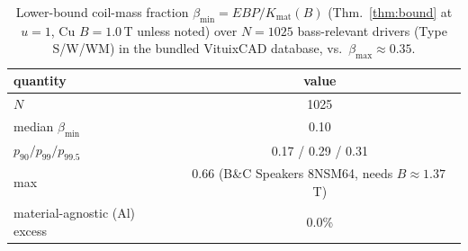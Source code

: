 \begin{table}[htbp]
\centering
\caption{Lower-bound coil-mass fraction $\beta_{\min}=EBP/K_{\mathrm{mat}}(B)$ (Thm.~\ref{thm:bound} at $u{=}1$, Cu $B{=}1.0$\,T unless noted) over $N{=}1025$ bass-relevant drivers (Type S/W/WM) in the bundled VituixCAD database, vs.\ $\beta_{\max}\approx0.35$.}
\label{tab:ebp-census}
\small
\begin{tabular}{lc}
\toprule
quantity & value\\
\midrule
$N$ & 1025\\
median $\beta_{\min}$ & 0.10\\
$p_{90}/p_{99}/p_{99.5}$ & 0.17 / 0.29 / 0.31\\
max & 0.66 (B\&C Speakers 8NSM64, needs $B{\approx}1.37$\,T)\\
material-agnostic (Al) excess & 0.0\%\\
\bottomrule
\end{tabular}
\end{table}
